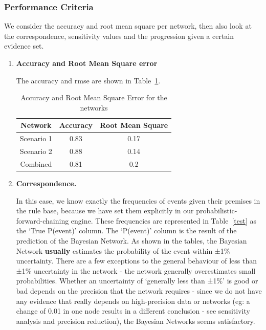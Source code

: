 \subsubsection{Performance Criteria}
We consider the accuracy and root mean square per network, then also look at the correspondence, sensitivity values and the progression given a certain evidence set.

\begin{enumerate}
\item \textbf{Accuracy and Root Mean Square error}

The accuracy and rmse are shown in Table~\ref{tabA}.

\begin{table}[h]
\begin{center}
\begin{tabular}{|c|c|c|}
 \hline
 Network & Accuracy & Root Mean Square\\
 \hline
 Scenario 1   & 0.83 &  0.17   \\
 Scenario 2 & 0.88 & 0.14 \\
 Combined & 0.81 & 0.2 \\
\hline
\end{tabular}
\caption{Accuracy and Root Mean Square Error for the networks}
\end{center}
\label{tabA}
\end{table}

\item \textbf{Correspondence.}

In this case, we know exactly the frequencies of events given their premises in the rule base, because we have set them explicitly in our probabilistic-forward-chaining engine. These frequencies are represented in Table~\ref{test} as the `True P(event)' column. The `P(event)' column is the result of the prediction of the Bayesian Network. As shown in the tables, the Bayesian Network \textbf{usually} estimates the probability of the event within ±1\% uncertainty. There are a few exceptions to the general behaviour of less than ±1\% uncertainty in the network - the network generally overestimates small probabilities. Whether an uncertainty of `generally less than ±1\%' is good or bad depends on the precision that the network requires - since we do not have any evidence that really depends on high-precision data or networks (eg: a change of 0.01 in one node results in a different conclusion - see sensitivity analysis and precision reduction), the Bayesian Networks seems satisfactory. 



\end{enumerate}
